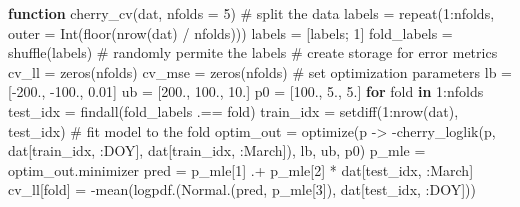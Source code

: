 \documentclass[
  letterpaper,
  DIV=11,
  numbers=noendperiod]{scrartcl}
\newenvironment{Shaded}{\begin{snugshade}}{\end{snugshade}}
\newcommand{\CommentTok}[1]{\textcolor[rgb]{0.37,0.37,0.37}{#1}}
\newcommand{\ControlFlowTok}[1]{\textcolor[rgb]{0.00,0.23,0.31}{\textbf{#1}}}
\newcommand{\FloatTok}[1]{\textcolor[rgb]{0.68,0.00,0.00}{#1}}
\newcommand{\FunctionTok}[1]{\textcolor[rgb]{0.28,0.35,0.67}{#1}}
\newcommand{\KeywordTok}[1]{\textcolor[rgb]{0.00,0.23,0.31}{\textbf{#1}}}
\newcommand{\NormalTok}[1]{\textcolor[rgb]{0.00,0.23,0.31}{#1}}
\newcommand{\OperatorTok}[1]{\textcolor[rgb]{0.37,0.37,0.37}{#1}}
\newcommand*\circled[1]{\tikz[baseline=(char.base)]{
          \node[shape=circle,draw,inner sep=1pt] (char) {{\scriptsize#1}};}}
\begin{document}
\label{annotated-cell-7}%
\begin{Shaded}
\begin{Highlighting}[]
\KeywordTok{function} \FunctionTok{cherry\_cv}\NormalTok{(dat, nfolds }\OperatorTok{=} \FloatTok{5}\NormalTok{)}
    \CommentTok{\# split the data}
\NormalTok{    labels }\OperatorTok{=} \FunctionTok{repeat}\NormalTok{(}\FloatTok{1}\OperatorTok{:}\NormalTok{nfolds, outer }\OperatorTok{=} \FunctionTok{Int}\NormalTok{(}\FunctionTok{floor}\NormalTok{(}\FunctionTok{nrow}\NormalTok{(dat) }\OperatorTok{/}\NormalTok{ nfolds))) }\hspace*{\fill}\NormalTok{\circled{1}}
\NormalTok{    labels }\OperatorTok{=}\NormalTok{ [labels; }\FloatTok{1}\NormalTok{] }
\NormalTok{    fold\_labels }\OperatorTok{=} \FunctionTok{shuffle}\NormalTok{(labels) }\CommentTok{\# randomly permite the labels}
    \CommentTok{\# create storage for error metrics}
\NormalTok{    cv\_ll }\OperatorTok{=} \FunctionTok{zeros}\NormalTok{(nfolds)}
\NormalTok{    cv\_mse }\OperatorTok{=} \FunctionTok{zeros}\NormalTok{(nfolds)}
    \CommentTok{\# set optimization parameters}
\NormalTok{    lb }\OperatorTok{=}\NormalTok{ [}\OperatorTok{{-}}\FloatTok{200}\NormalTok{., }\OperatorTok{{-}}\FloatTok{100}\NormalTok{., }\FloatTok{0.01}\NormalTok{]}
\NormalTok{    ub }\OperatorTok{=}\NormalTok{ [}\FloatTok{200}\NormalTok{., }\FloatTok{100}\NormalTok{., }\FloatTok{10}\NormalTok{.]}
\NormalTok{    p0 }\OperatorTok{=}\NormalTok{ [}\FloatTok{100}\NormalTok{., }\FloatTok{5}\NormalTok{., }\FloatTok{5}\NormalTok{.]}
    \ControlFlowTok{for}\NormalTok{ fold }\KeywordTok{in} \FloatTok{1}\OperatorTok{:}\NormalTok{nfolds}
\NormalTok{        test\_idx }\OperatorTok{=} \FunctionTok{findall}\NormalTok{(fold\_labels }\OperatorTok{.==}\NormalTok{ fold)}
\NormalTok{        train\_idx }\OperatorTok{=} \FunctionTok{setdiff}\NormalTok{(}\FloatTok{1}\OperatorTok{:}\FunctionTok{nrow}\NormalTok{(dat), test\_idx)}
        \CommentTok{\# fit model to the fold}
\NormalTok{        optim\_out }\OperatorTok{=} \FunctionTok{optimize}\NormalTok{(p }\OperatorTok{{-}\textgreater{}} \FunctionTok{{-}cherry\_loglik}\NormalTok{(p, dat[train\_idx, }\OperatorTok{:}\NormalTok{DOY], dat[train\_idx, }\OperatorTok{:}\NormalTok{March]), lb, ub, p0)}
\NormalTok{        p\_mle }\OperatorTok{=}\NormalTok{ optim\_out.minimizer}
\NormalTok{        pred }\OperatorTok{=}\NormalTok{ p\_mle[}\FloatTok{1}\NormalTok{] }\OperatorTok{.+}\NormalTok{ p\_mle[}\FloatTok{2}\NormalTok{] }\OperatorTok{*}\NormalTok{ dat[test\_idx, }\OperatorTok{:}\NormalTok{March]}
\NormalTok{        cv\_ll[fold] }\OperatorTok{=} \FunctionTok{{-}mean}\NormalTok{(}\FunctionTok{logpdf}\NormalTok{.(}\FunctionTok{Normal}\NormalTok{.(pred, p\_mle[}\FloatTok{3}\NormalTok{]), dat[test\_idx, }\OperatorTok{:}\NormalTok{DOY])) }\hspace*{\fill}\NormalTok{\circled{2}}

\end{Highlighting}
\end{Shaded}
\end{document}
